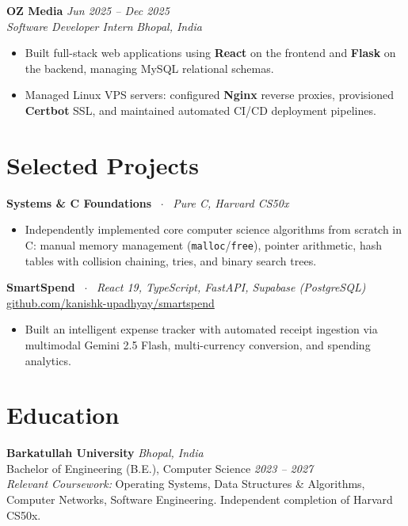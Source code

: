 \documentclass[10pt,a4paper]{article}
\begin{document}
\textbf{OZ Media} \hfill \textit{Jun 2025 -- Dec 2025} \\
\textit{Software Developer Intern} \hfill \textit{Bhopal, India}
\begin{itemize}
    \item Built full-stack web applications using \textbf{React} on the frontend and \textbf{Flask} on the backend, managing MySQL relational schemas.
    \item Managed Linux VPS servers: configured \textbf{Nginx} reverse proxies, provisioned \textbf{Certbot} SSL, and maintained automated CI/CD deployment pipelines.
\end{itemize}

\section{Selected Projects}
\textbf{Systems \& C Foundations} \ $\cdot$ \ \textit{Pure C, Harvard CS50x}
\begin{itemize}
    \item Independently implemented core computer science algorithms from scratch in C: manual memory management (\texttt{malloc}/\texttt{free}), pointer arithmetic, hash tables with collision chaining, tries, and binary search trees.
\end{itemize}

\textbf{SmartSpend} \ $\cdot$ \ \textit{React 19, TypeScript, FastAPI, Supabase (PostgreSQL)} \hfill \href{https://github.com/kanishk-upadhyay/smartspend}{github.com/kanishk-upadhyay/smartspend}
\begin{itemize}
    \item Built an intelligent expense tracker with automated receipt ingestion via multimodal Gemini 2.5 Flash, multi-currency conversion, and spending analytics.
\end{itemize}

\section{Education}
\textbf{Barkatullah University} \hfill \textit{Bhopal, India} \\
Bachelor of Engineering (B.E.), Computer Science \hfill \textit{2023 -- 2027} \\
\textit{Relevant Coursework:} Operating Systems, Data Structures \& Algorithms, Computer Networks, Software Engineering. Independent completion of Harvard CS50x.
\end{document}
